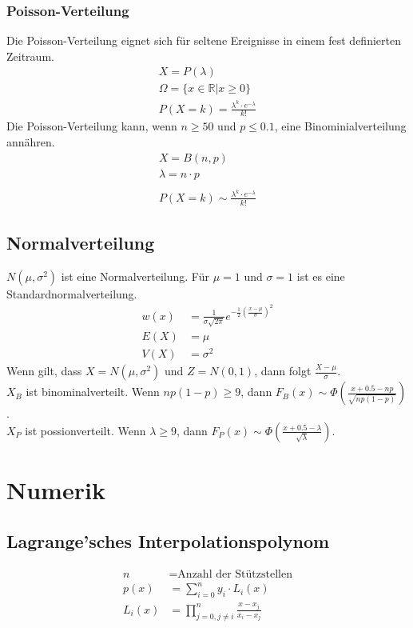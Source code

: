 \documentclass[a4paper, 11pt]{article}
\begin{document}
\begin{multicols}{3}
\begin{small}
		    \subsubsection{Poisson-Verteilung}
		    Die Poisson-Verteilung eignet sich für seltene Ereignisse in einem fest definierten Zeitraum.
			    \begin{align*}
			    X = P(\lambda)\\
			    \Omega = \{x \in \mathbb{R} | x \geq 0\}\\
			    P(X = k) = \frac{\lambda^k \cdot e^{-\lambda}}{k!}	
			    \end{align*}
		    Die Poisson-Verteilung kann, wenn $n \ge 50$ und $p \leq 0.1$, eine Binominialverteilung annähren.
			    \begin{align*}
			    X = B(n, p) \\
			    \lambda = n \cdot p \\\\
			    P(X = k) \sim \frac{\lambda^k \cdot e^{-\lambda}}{k!}	
			    \end{align*}
	    	\subsection{Normalverteilung}
	    	$N(\mu, \sigma^2)$ ist eine Normalverteilung. Für $\mu = 1$ und $\sigma = 1$ ist es eine Standardnormalverteilung.
	    	\begin{align*}
	    		w(x) &= \frac{1}{\sigma \sqrt{2 \pi}} e^{-\frac{1}{2}(\frac{x-\mu}{\sigma})^2}\\
	    		E(X) &= \mu\\
	    		V(X) &= \sigma^2
	    	\end{align*}
	    	Wenn gilt, dass $X = N(\mu, \sigma^2)$ und $Z = N(0,1)$, dann folgt $\frac{X - \mu}{\sigma}$. \\
	    	$X_B$ ist binominalverteilt. Wenn $np(1-p)\ge9$, dann $F_B(x) \sim \Phi\left(\frac{x + 0.5 - np}{\sqrt{np(1-p)}}\right)$. \\
	    	$X_P$ ist possionverteilt. Wenn $\lambda \ge 9$, dann $F_P(x) \sim \Phi\left(\frac{x + 0.5 - \lambda}{\sqrt{\lambda}}\right)$.
	\section{Numerik}
		\subsection{Lagrange'sches Interpolationspolynom}
			\begin{align*}
			n &= \text{Anzahl der Stützstellen}\\
			p(x) &= \sum_{i=0}^{n} y_i \cdot L_i(x) \\
			L_i(x) &= \prod_{j = 0, j \neq i}^{n} \frac{x - x_j}{x_i - x_j}
			\end{align*}

\end{small}
\end{multicols}
\end{document}
